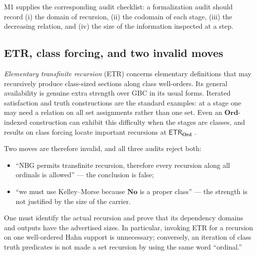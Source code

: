 \documentclass[11pt,letterpaper]{article}
\numberwithin{equation}{section}
\theoremstyle{definition}
\theoremstyle{remark}
\newcommand{\No}{\mathbf{No}}
\newcommand{\Ord}{\mathbf{Ord}}
\newcommand{\ETR}{\mathsf{ETR}}
\begin{document}
M1 supplies the corresponding audit checklist: a formalization audit should
record (i) the domain of recursion, (ii) the codomain of each stage, (iii) the
decreasing relation, and (iv) the size of the information inspected at a step.

\subsection{ETR, class forcing, and two invalid moves}
\label{found:sub:etr}
\emph{Elementary transfinite recursion} (ETR) concerns elementary definitions
that may recursively produce class-sized sections along class well-orders. Its
general availability is genuine extra strength over GBC in its usual forms.
Iterated satisfaction and truth constructions are the standard examples: at a
stage one may need a relation on all set assignments rather than one set. Even
an $\Ord$-indexed construction can exhibit this difficulty when the stages are
classes, and results on class forcing locate important recursions at
$\ETR_{\Ord}$ \cite{found:ClassForcing,found:GitmanHamkins,found:HamkinsETR}.

Two moves are therefore invalid, and all three audits reject both:
\begin{itemize}
\item ``NBG permits transfinite recursion, therefore every recursion along all
ordinals is allowed'' --- the conclusion is false;
\item ``we must use Kelley--Morse because $\No$ is a proper class'' --- the
strength is not justified by the size of the carrier.
\end{itemize}
One must identify the actual recursion and prove that its dependency domains and
outputs have the advertised sizes. In particular, invoking ETR for a recursion
on one well-ordered Hahn support is unnecessary; conversely, an iteration of
class truth predicates is not made a set recursion by using the same word
``ordinal.''
\end{document}
